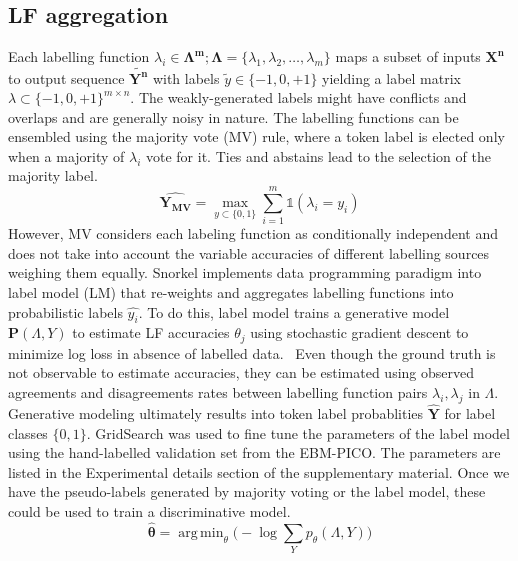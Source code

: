 \documentclass[10.7pt,]{article}
\DeclareMathOperator*{\argmin}{arg\,min}
\begin{document}
\subsection{LF aggregation}\label{lms}
%
Each labelling function $ \lambda_{i} \in \bm{\Lambda^{m}}; \bm{\Lambda} = \{\lambda_{1}, \lambda_{2}, \dotso, \lambda_{m} \} $ maps a subset of inputs $\bm{X^{n}}$ to output sequence $ \widetilde{\bm{Y^{n}}}$ with labels $\widetilde{y} \in \{-1, 0, +1\}$ yielding a label matrix $ \lambda \subset \{-1, 0, +1\}^{m \times n}$.
The weakly-generated labels might have conflicts and overlaps and are generally noisy in nature.
The labelling functions can be ensembled using the majority vote (MV) rule, where a token label is elected only when a majority of $\lambda_{i}$ vote for it.
Ties and abstains lead to the selection of the majority label.
%
\begin{equation}
\bm{\hat{Y_{MV}}} = \max_{{y \subset \{ 0, 1 \} }} \sum_{i=1}^{m} \mathds{1} (\lambda_{i} = y_{i})
\end{equation}
%
However, MV considers each labeling function as conditionally independent and does not take into account the variable accuracies of different labelling sources weighing them equally.
Snorkel implements data programming paradigm into label model (LM) that re-weights and aggregates labelling functions into probabilistic labels $\hat{y_{i}}$.
To do this, label model trains a generative model $ \bm{P} ( \Lambda , Y )$ to estimate LF accuracies $\theta_{j}$ using stochastic gradient descent to minimize log loss in absence of labelled data.~\cite{ratner2017snorkel,dunnmon2020cross}
Even though the ground truth is not observable to estimate accuracies, they can be estimated using observed agreements and disagreements rates between labelling function pairs $ \lambda_{i}, \lambda_{j}$ in $\Lambda$.
Generative modeling ultimately results into token label probablities $\bm{\hat{Y}}$ for label classes $ \{ 0, 1\} $.
GridSearch was used to fine tune the parameters of the label model using the hand-labelled validation set from the EBM-PICO.
The parameters are listed in the Experimental details section of the supplementary material.
Once we have the pseudo-labels generated by majority voting or the label model, these could be used to train a discriminative model.
%
\begin{equation}
\bm{\hat{\theta}} = \argmin_{\theta} \big( -\log \sum_{Y} p_{\theta} (\Lambda , Y ) \big)
\end{equation}
%
%
%
\end{document}
